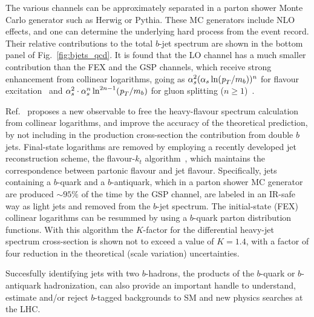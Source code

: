 The various channels can be approximately separated in a parton shower Monte Carlo generator such as {\sc Herwig} or {\sc Pythia}. These MC generators include NLO effects, and 
one can determine the underlying hard process from the event record.  Their relative contributions to the total $b$-jet spectrum are shown in the bottom panel of Fig.~\ref{fig:bjets_qcd}. It is found that the LO channel has a much smaller contribution than the FEX and the GSP channels, which
receive strong enhancement from collinear logarithms, %
going as $\alpha_s^2 (\alpha_s \ln( {\emph{p}_{T}} / m_b))^n$ for flavour excitation~\cite{Altarelli1977298} 
and $\alpha_s^2 \cdot \alpha_s^n \ln^{2n-1}({\emph{p}_{T}}/m_b)$ for gluon splitting ($n\ge 1$)~\cite{Seymour1995163}.

Ref.~\cite{Salam.AccurateHQ} proposes a new observable to free the heavy-flavour spectrum calculation from collinear logarithms, and improve the accuracy of the theoretical prediction,
by not including in the production cross-section the contribution from double $b$ jets. Final-state logarithms are removed by employing a recently developed jet reconstruction scheme, the flavour-$k_t$ algorithm~\cite{flavorkt}, which maintains the correspondence between partonic flavour and jet flavour. Specifically, jets containing a $b$-quark and a $b$-antiquark, which in a parton shower MC generator are produced $\sim95\%$ of the time by the GSP channel, are labeled in an IR-safe way as light jets and removed from the $b$-jet spectrum.
The initial-state (FEX) collinear logarithms can be resummed by using a $b$-quark parton distribution functions.
With this algorithm the $K$-factor for the differential heavy-jet spectrum cross-section is shown not to exceed a value of $K=1.4$, with a factor of four reduction in the theoretical (scale variation) uncertainties.




Succesfully identifying jets with two $b$-hadrons, the products of the $b$-quark or $b$-antiquark hadronization, 
can also provide an important handle to understand, estimate and/or reject $b$-tagged backgrounds to SM and new physics searches at the LHC.


